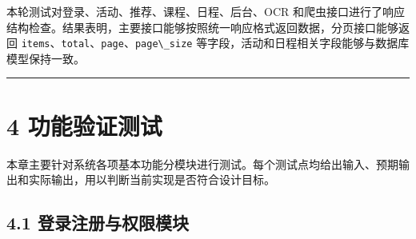 本轮测试对登录、活动、推荐、课程、日程、后台、OCR
和爬虫接口进行了响应结构检查。结果表明，主要接口能够按照统一响应格式返回数据，分页接口能够返回
\passthrough{\lstinline!items!}、\passthrough{\lstinline!total!}、\passthrough{\lstinline!page!}、\passthrough{\lstinline!page\_size!}
等字段，活动和日程相关字段能够与数据库模型保持一致。

\begin{center}\rule{0.5\linewidth}{0.5pt}\end{center}

\section{4 功能验证测试}\label{ux529fux80fdux9a8cux8bc1ux6d4bux8bd5}

本章主要针对系统各项基本功能分模块进行测试。每个测试点均给出输入、预期输出和实际输出，用以判断当前实现是否符合设计目标。

\subsection{4.1
登录注册与权限模块}\label{ux767bux5f55ux6ce8ux518cux4e0eux6743ux9650ux6a21ux5757}

